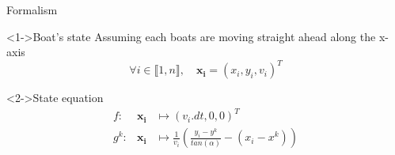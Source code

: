 \documentclass{beamer}
\begin{document}
        \begin{frame}{Formalism}
            \begin{block}<1->{Boat's state}
                Assuming each boats are moving straight ahead along the x-axis
                $$\forall i \in \llbracket 1, n\rrbracket, \quad \mathbf{x_i} = (x_i, y_i, v_i)^T$$ 
            \end{block}

            \begin{block}<2->{State equation}
                \begin{eqnarray}
                    f:& \mathbf{x_i} &\mapsto (v_i.dt, 0, 0)^T \\
                    g^k:& \mathbf{x_i}  &\mapsto \frac{1}{v_i} \left(\frac{y_i - y^k}{tan(\alpha)} - (x_i - x^k)\right)
                \end{eqnarray}
            \end{block}
        \end{frame}
\end{document}
